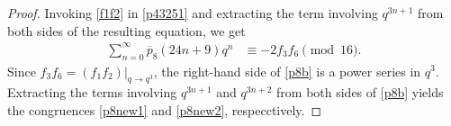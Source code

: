 \documentclass[11pt, reqno]{amsart}
\numberwithin{equation}{section}
\begin{document}
	\begin{proof}
		Invoking \eqref{f1f2} in \eqref{p43251} and extracting the term involving $q^{3n+1}$ from both sides of the resulting equation,
		we get
		\begin{align}
			\sum_{n=0}^{\infty}\overline{p}_{8}(24n+9)q^n&\equiv-2f_3f_6\pmod{16}.\label{p8b}
		\end{align}
		Since $f_3f_6=(f_1f_2)\big|_{q\to q^3}$, the right-hand side of \eqref{p8b} is
		a power series in $q^3$. Extracting the terms involving $q^{3n+1}$ and
		$q^{3n+2}$ from both sides of \eqref{p8b} yields the congruences
		\eqref{p8new1} and \eqref{p8new2}, respecctively.
	\end{proof}
	
\end{document}
